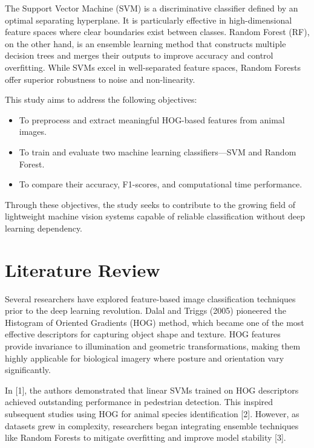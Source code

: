 \documentclass[conference]{IEEEtran}
\begin{document}
The Support Vector Machine (SVM) is a discriminative classifier defined by an optimal separating hyperplane. It is particularly effective in high-dimensional feature spaces where clear boundaries exist between classes. Random Forest (RF), on the other hand, is an ensemble learning method that constructs multiple decision trees and merges their outputs to improve accuracy and control overfitting. While SVMs excel in well-separated feature spaces, Random Forests offer superior robustness to noise and non-linearity.  
\vspace{3pt}

This study aims to address the following objectives:
\begin{itemize}
    \item To preprocess and extract meaningful HOG-based features from animal images.
    \item To train and evaluate two machine learning classifiers—SVM and Random Forest.
    \item To compare their accuracy, F1-scores, and computational time performance.
\end{itemize}
Through these objectives, the study seeks to contribute to the growing field of lightweight machine vision systems capable of reliable classification without deep learning dependency.

\section{Literature Review}
Several researchers have explored feature-based image classification techniques prior to the deep learning revolution. Dalal and Triggs (2005) pioneered the Histogram of Oriented Gradients (HOG) method, which became one of the most effective descriptors for capturing object shape and texture. HOG features provide invariance to illumination and geometric transformations, making them highly applicable for biological imagery where posture and orientation vary significantly.  
\vspace{3pt}

In [1], the authors demonstrated that linear SVMs trained on HOG descriptors achieved outstanding performance in pedestrian detection. This inspired subsequent studies using HOG for animal species identification [2]. However, as datasets grew in complexity, researchers began integrating ensemble techniques like Random Forests to mitigate overfitting and improve model stability [3].  
\vspace{3pt}
\end{document}
